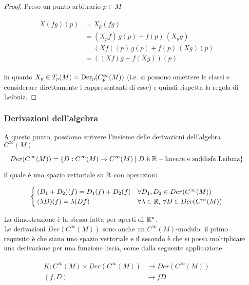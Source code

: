 \begin{proof}
	Preso un punto arbitrario $ p \in M $
	
	\begin{align}
		\begin{split}
			X(f g)(p) &= X_{p}(f g)\\
			&= (X_{p} f) \, g(p) + f(p) \, (X_{p} g)\\
			&= (X f)(p) \, g(p) + f(p) \, (X g)(p)\\
			&= ((X f) g + f (X g))(p)
		\end{split}
	\end{align}
	
	in quanto $ X_{p} \in T_{p}(M) = \operatorname{Der}_{p}(C_{p}^{\infty}(M)) $ (i.e. si possono omettere le classi e considerare direttamente i rappresentanti di esse) e quindi rispetta la regola di Leibniz.
\end{proof}

\subsubsection{Derivazioni dell'algebra}

A questo punto, possiamo scrivere l'insieme delle derivazioni dell'algebra $ C^{\infty}(M) $

\begin{equation}
	Der(C^{\infty}(M)) = \{ D : C^{\infty}(M) \to C^{\infty}(M) \mid D \text{ è } \mathbb{R}-\text{lineare e soddisfa Leibniz} \}
\end{equation}

il quale è uno spazio vettoriale su $ \mathbb{R} $ con operazioni

\begin{equation}
	\begin{cases}
		(D_{1} + D_{2})(f) = D_{1}(f) + D_{2}(f) & \forall D_{1},D_{2} \in Der(C^{\infty}(M))\\
		(\lambda D)(f) = \lambda (D f) & \forall \lambda \in \mathbb{R}, \, \forall D \in Der(C^{\infty}(M))
	\end{cases}
\end{equation}

La dimostrazione è la stessa fatta per aperti di $ \mathbb{R}^{n} $.\\
Le derivazioni $ Der(C^{\infty}(M)) $ sono anche un $ C^{\infty}(M) $-modulo: il primo requisito è che siano uno spazio vettoriale e il secondo è che si possa moltiplicare una derivazione per una funzione liscia, come dalla seguente applicazione

\begin{align}
	\begin{split}
		K : C^{\infty}(M) \times Der(C^{\infty}(M)) &\to Der(C^{\infty}(M))\\
		(f,D) &\mapsto f D
	\end{split}
\end{align}

